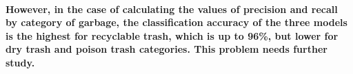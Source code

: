 \documentclass{article}
\begin{document}
\paragraph{However, in the case of calculating the values of precision and recall by category of garbage, the classification accuracy of the three models is the highest for recyclable trash, which is up to 96\%, but lower for dry trash and poison trash categories. This problem needs further study.}

\nocite{*}


\end{document}
